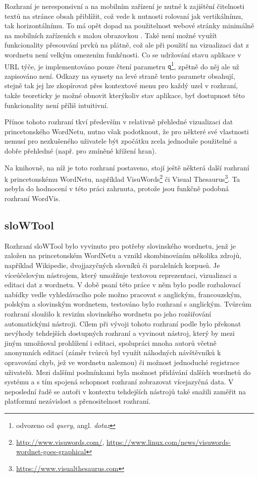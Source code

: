 \documentclass[a4paper, 11pt, oneside]{book}
\begin{document}
					Rozhraní je neresponsivní a na mobilním zařízení je nutné k zajištění čitelnosti textů na stránce obsah přiblížit, což vede k nutnosti rolovaní jak vertikálnímu, tak horizontálnímu. To má opět dopad na použitelnost webové stránky minimálně na mobilních zařízeních s malou obrazovkou \parencite{nn2005scrollbar, richards2004web}. Také není možné využít funkcionality přesouvání prvků na plátně, což ale při použití na vizualizaci dat z wordnetu není velkým omezením funkčnosti. Co se udržování stavu aplikace v URL týče, je implementováno pouze čtení parametru {\tt q}\footnote{odvozeno od \textit{query}, angl. \textit{dotaz}}, zpětně do něj ale už zapisováno není. Odkazy na synsety na levé straně tento parametr obsahují, stejně tak jej lze zkopírovat přes kontextové menu pro každý uzel v rozhraní, takže teoreticky je možné obnovit kterýkoliv stav aplikace, byť dostupnost této funkcionality není příliš intuitivní.

					Přínos tohoto rozhraní tkví především v relativně přehledné vizualizaci dat princetonského WordNetu, nutno však podotknout, že pro některé své vlastnosti nemusí pro nezkušeného uživatele být zpočátku zcela jednoduše použitelné a dobře přehledné (např. pro zmíněné křížení hran).

					Na knihovně, na níž je toto rozhraní postaveno, stojí ještě některá další rozhraní k princetonskému WordNetu, například VisuWords\footnote{\url{http://www.visuwords.com/}, \url{https://www.linux.com/news/visuwords-wordnet-goes-graphical}} či Visual Thesaurus\footnote{\url{https://www.visualthesaurus.com}}. Ta nebyla do hodnocení v této práci zahrnuta, protože jsou funkčně podobná rozhraní WordVis.

				\subsection{sloWTool}
				\label{vis:slowtool}

					Rozhraní sloWTool bylo vyvinuto pro potřeby slovinského wordnetu, jenž je založen na princetonském WordNetu a vznikl skombinováním několika zdrojů, například Wikipedie, dvojjazyčných slovníků či paralelních korpusů. Je víceúčelovým nástrojem, který umožňuje textovou reprezentaci, vizualizaci a editaci dat z wordnetu. V době psaní této práce v něm bylo podle rozbalovací nabídky vedle vyhledávacího pole možno pracovat s anglickým, francouzským, polským a slovinským wordnetem, testováno bylo rozhraní s anglickým. Tvůrcům rozhraní sloužilo k revizím slovinského wordnetu po jeho rozšiřování automatickými nástroji. \parencite{fivser2012slownet} Cílem při vývoji tohoto rozhraní podle \textcite{fivser2011visualizing} bylo překonat nevýhody tehdejších dostupných rozhraní a vyvinout nástroj, který by mezi jiným umožňoval prohlížení i editaci, spolupráci mnoha autorů včetně anonymních editací (záměr tvůrců byl využít náhodných návštěvníků k opravování chyb, jež ve wordnetu naleznou) či možnost jednoduché registrace uživatelů. Mezi dalšími podmínkami byla možnost přidávání dalších wordnetů do systému a s tím spojená schopnost rozhraní zobrazovat vícejazyčná data. V neposlední řadě se autoři v kontextu tehdejších nástrojů také snažili zaměřit na platformní nezávislost a přenositelnost rozhraní. 
\end{document}

